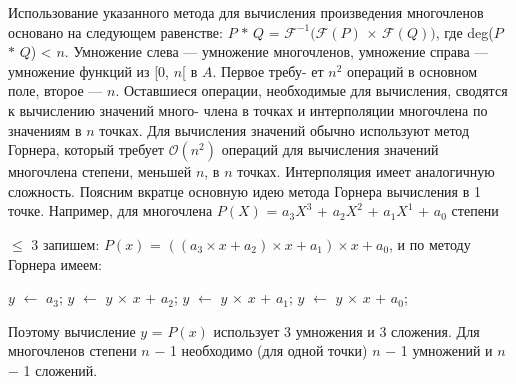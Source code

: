 \vspace{0pt}Использование указанного метода для вычисления произведения \linebreak
многочленов основано на следующем равенстве: $P$ $\ast$ $Q$ = $\mathcal{F}^{-1}(\mathcal{F}(P)$ $\times$ \linebreak
$\mathcal{F}(Q) )$, где deg($P$ $\ast$ $Q$) < $n$. Умножение слева --- умножение многочленов, \linebreak
умножение справа --- умножение функций из [0, $n$[ в $A$.  Первое требу­- \linebreak
ет $n^2$ операций в основном поле, второе --- $n$. Оставшиеся операции, \linebreak
необходимые для вычисления, сводятся к вычислению значений много- \linebreak
члена в точках и интерполяции многочлена по значениям в $n$ точках. \linebreak
Для вычисления значений обычно используют метод Горнера, который \linebreak
требует $\mathcal{O}(n^2)$ операций для вычисления значений многочлена степени, \linebreak
меньшей $n$, в $n$ точках. Интерполяция имеет аналогичную сложность. \linebreak
Поясним вкратце основную идею метода Горнера вычисления в 1 точке. \linebreak
Например, для многочлена $P(X)$ = $a_3X^3$ + $a_2X^2$ + $a_1X^1$ + $a_0$ степени \linebreak

\newpage
{}
\noindent $\leqslant$ 3 запишем: $P(x)$ = $((a_3 \times x + a_2) \times x + a_1) \times x + a_0$, и по методу Горнера \linebreak
имеем:

\begin{center}
$y$ $\longleftarrow$ $a_3$; $y$ $\longleftarrow$ $y$ $\times$ $x$ + $a_2$; $y$ $\longleftarrow$ $y$ $\times$ $x$ + $a_1$; $y$ $\longleftarrow$ $y$ $\times$ $x$ + $a_0$;
\end{center}

\noindent Поэтому вычисление $y$ = $P(x)$ использует 3 умножения и 3 сложения. \linebreak
Для многочленов степени $n$ $-$ 1 необходимо (для одной точки) $n$ $-$ 1 \linebreak
умножений и $n$ $-$ 1 сложений. \ 

